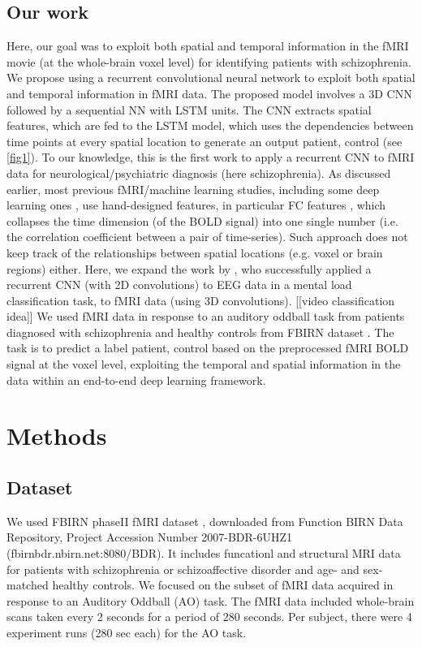 \documentclass{article}
\begin{document}
\subsection{Our work}

Here, our goal was to exploit both spatial and temporal information in the fMRI movie (at the whole-brain voxel level) for identifying patients with schizophrenia. We propose using a recurrent convolutional neural network to exploit both spatial and temporal information in fMRI data. The proposed model involves a 3D CNN followed by a sequential NN with LSTM units. The CNN extracts spatial features, which are fed to the LSTM model, which uses the dependencies between time points at every spatial location to generate an output {patient, control} (see \ref{fig1}). To our knowledge, this is the first work to apply a recurrent CNN to fMRI data for neurological/psychiatric diagnosis (here schizophrenia). As discussed earlier, most previous fMRI/machine learning studies, including some deep learning ones \citep{Kim2016}, use hand-designed features, in particular FC features \citep{Gheiratmand2017}, which collapses the time dimension (of the BOLD signal) into one single number (i.e. the correlation coefficient between a pair of time-series). Such approach does not keep track of the relationships between spatial locations (e.g. voxel or brain regions) either. Here, we expand the work by \citet{Bashivan2016}, who successfully applied a recurrent CNN (with 2D convolutions) to EEG data in a mental load classification task, to fMRI data (using 3D convolutions). [[video classification idea]] We used fMRI data in response to an auditory oddball task from patients diagnosed with schizophrenia and healthy controls from FBIRN dataset \citep{Keator2016}. The task is to predict a label {patient, control} based on the preprocessed fMRI BOLD signal at the voxel level, exploiting the temporal and spatial information in the data within an end-to-end deep learning framework.

\section{Methods}

\subsection{Dataset}

We used FBIRN phaseII fMRI dataset \citep{Keator2016}, downloaded from Function BIRN Data Repository, Project Accession Number 2007-BDR-6UHZ1 (fbirnbdr.nbirn.net:8080/BDR). It includes funcationl and structural MRI data for patients with schizophrenia or schizoaffective disorder and age- and sex-matched healthy controls. We focused on the subset of fMRI data acquired in response to an Auditory Oddball (AO) task. The fMRI data included whole-brain scans taken every 2 seconds for a period of 280 seconds. Per subject, there were 4 experiment runs (280 sec each) for the AO task.
\end{document}
